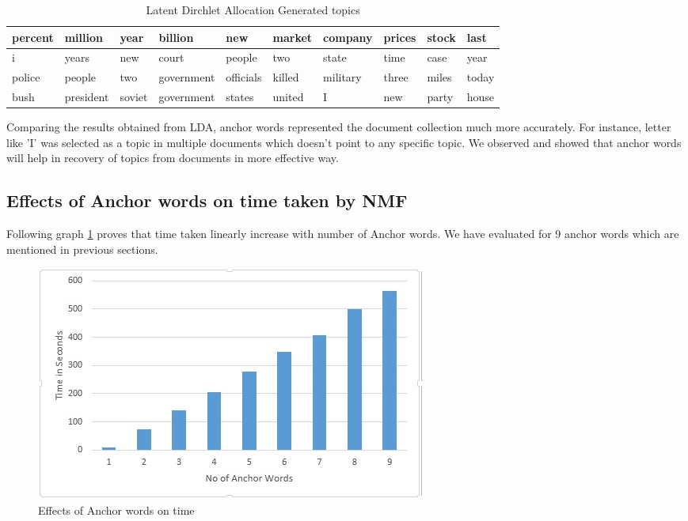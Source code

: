 \documentclass[a4paper,11pt]{article}
\begin{document}
\begin{table}[h]
    \begin{tabular}{|l|l|l|l|l|l|l|l|l|l|}
    \hline
    percent & million   & year   & billion    & new       & market & company  & prices & stock & last  \\ \hline
    i       & years     & new    & court      & people    & two    & state    & time   & case  & year  \\ \hline
    police  & people    & two    & government & officials & killed & military & three  & miles & today \\ \hline
    bush    & president & soviet & government & states    & united & I        & new    & party & house \\ \hline
    \end{tabular}
    \caption {Latent Dirchlet Allocation Generated topics}
\end{table}

Comparing the results obtained from LDA, anchor words represented the document collection much more accurately. For instance, letter like 'I' was selected as a topic in multiple documents which doesn't point to any specific topic. We observed and showed that anchor words will help in recovery of topics from documents in more effective way. 

\subsection{Effects of Anchor words on time taken by NMF}

Following graph \ref{fig:anchor_words} proves that time taken linearly increase with number of Anchor words. We have evaluated for 9 anchor words which are mentioned in previous sections. 

\begin{figure}[htb]
\centering
\includegraphics[scale=1.0]{anchor_words.jpg}
\caption{Effects of Anchor words on time}
\label{fig:anchor_words}
\end{figure}
\end{document}
